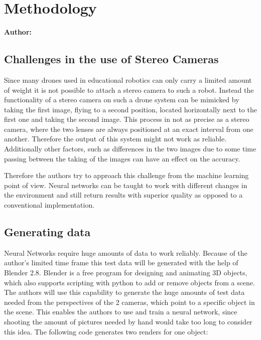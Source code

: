\chapter{Methodology}

\textbf{Author: } 

\section{Challenges in the use of Stereo Cameras}
Since many drones used in educational robotics can only carry a limited amount of weight it is not possible to attach a stereo camera to such a robot. Instead the functionality of a stereo camera on such a drone system can be mimicked by taking the first image, flying to a second position, located horizontally next to the first one and taking the second image. This process in not as precise as a stereo camera, where the two lenses are always positioned at an exact interval from one another. Therefore the output of this system might not work as reliable. Additionally other factors, such as differences in the two images due to some time passing between the taking of the images can have an effect on the accuracy.

Therefore the authors try to approach this challenge from the machine learning point of view. Neural networks can be taught to work with different changes in the environment and still return results with superior quality as opposed to a conventional implementation.

\section{Generating data}
Neural Networks require huge amounts of data to work reliably. Because of the author's limited time frame this test data will be generated with the help of Blender 2.8. Blender is a free program for designing and animating 3D objects, which also supports scripting with python to add or remove objects from a scene. The authors will use this capability to generate the huge amounts of test data needed from the perspectives of the 2 cameras, which point to a specific object in the scene. This enables the authors to use and train a neural network, since shooting the amount of pictures needed by hand would take too long to consider this idea. 
The following code generates two renders for one object:

\newpage

